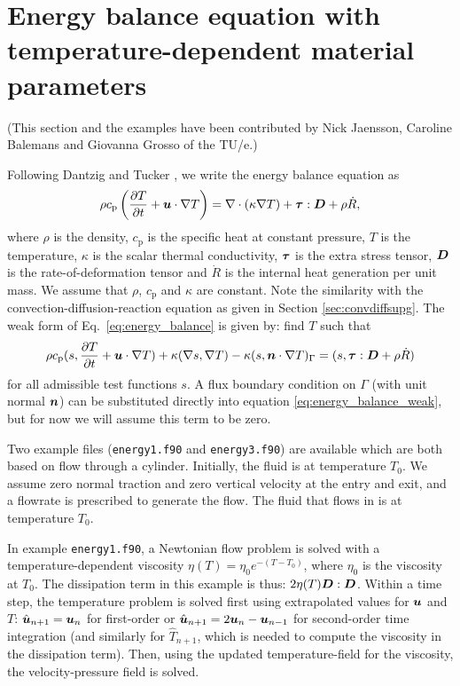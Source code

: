 
\def\headdate{2nd December 2025}

\section{Energy balance equation with temperature-dependent material parameters}
\label{sec:energy}

(This section and the examples have been contributed by Nick Jaensson, Caroline
Balemans and Giovanna Grosso of the TU/e.)\medskip

Following Dantzig and Tucker \cite{Dantzig2001}, we write the energy balance 
equation as
\begin{equation}
  \rho c_\mathrm{p} \left( \dfrac{\partial T}{\partial t} + \boldsymbol{u} \cdot \nabla T \right) = 
  \nabla \cdot (\kappa \nabla T) + \boldsymbol{\tau} : \boldsymbol{D} + \rho \dot{R}, 
  \label{eq:energy_balance}
\end{equation}
where $\rho$ is the density, $c_\mathrm{p}$ is the specific heat at constant 
pressure, $T$ is the temperature, $\kappa$ is the scalar thermal conductivity, 
$\boldsymbol{\tau}$ is the extra stress tensor, $\boldsymbol{D}$ is the rate-of-deformation tensor 
and $\dot{R}$ is the internal heat generation per unit mass. We assume that 
$\rho$, $c_\mathrm{p}$ and $\kappa$ are constant. Note the similarity with the 
convection-diffusion-reaction equation as given in 
Section \ref{sec:convdiffsupg}. The weak form of Eq.~\eqref{eq:energy_balance}
is given by: find $T$ such that
\begin{equation}
 \rho c_\mathrm{p} (s, \dfrac{\partial T}{\partial t}+\boldsymbol{u} \cdot \nabla T) + \kappa (\nabla s,
 \nabla T)-\kappa (s, \boldsymbol{n} \cdot \nabla T)_\Gamma = (s, \boldsymbol{\tau} : \boldsymbol{D} + 
 \rho \dot{R} ) \label{eq:energy_balance_weak}
\end{equation}
for all admissible test functions $s$. A flux boundary condition on 
$\Gamma$ (with unit normal $\boldsymbol{n}$) can be substituted directly into equation 
\eqref{eq:energy_balance_weak}, but for now we will assume this term to be zero.

Two example files (\texttt{energy1.f90} and \texttt{energy3.f90})
are available which are both based on flow through a 
cylinder. Initially, the fluid is at temperature $T_0$. We 
assume zero normal 
traction and zero vertical velocity at the entry and exit, and a flowrate is 
prescribed to generate the flow. The fluid that flows in is at temperature 
$T_0$.

In example 
\texttt{energy1.f90}, a Newtonian flow problem is solved with a 
temperature-dependent viscosity $\eta(T)=\eta_0 e^{-(T-T_0)}$, where $\eta_0$ 
is 
the viscosity at $T_0$. The dissipation term in this example is thus:
$2\eta(T)\boldsymbol{D}:\boldsymbol{D}$. Within a time step, the temperature problem is solved 
first using 
extrapolated values for $\boldsymbol{u}$ and $T$: $\hat{\boldsymbol{u}}_{n+1}=\boldsymbol{u}_n$ for 
first-order or $\hat{\boldsymbol{u}}_{n+1}=2\boldsymbol{u}_n-\boldsymbol{u}_{n-1}$ for second-order 
time integration (and similarly for $\hat{T}_{n+1}$, which is needed to compute 
the viscosity in the 
dissipation term). Then, using the updated temperature-field for the viscosity, 
the velocity-pressure field is solved. 

